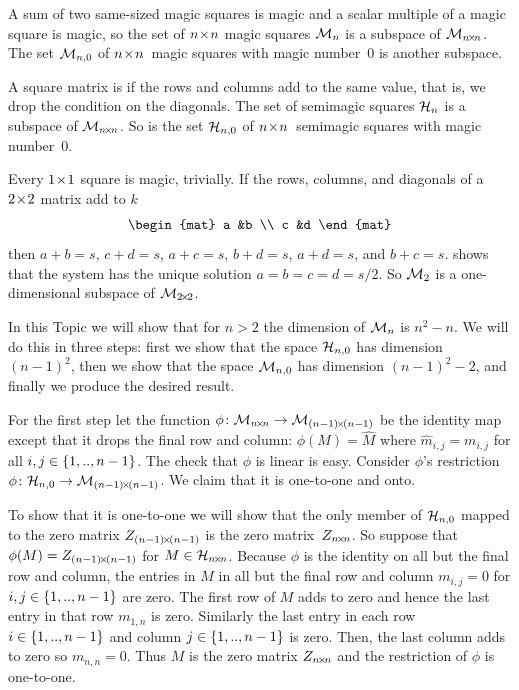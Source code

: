 A sum of two same-sized magic squares is magic and a 
scalar multiple of a magic square is magic, so the set of 
$n \! \times \! n$ magic squares
$\mathcal{M}_n$ is a subspace of $\mathcal{M}_{n \! \times \! n}$.
The set $\mathcal{M}_{n,0}$ of $n \! \times \! n$~magic squares with magic number~$0$ 
is another subspace.

A square matrix is  if 
the rows and columns add to the same value, that is, we drop the
condition on the diagonals.
The set of semimagic squares $\mathcal{H}_n$ 
is a subspace of $\mathcal{M}_{n \! \times \! n}$.
So is the set $\mathcal{H}_{n,0}$  
of $n \! \times \! n$~semimagic squares with magic number~$0$. 

Every $1 \! \times \! 1$ square is magic, trivially.
If the rows, columns, and diagonals of a $2 \! \times \! 2$ matrix add to $k$
\begin{equation*}
  \begin{mat}
    a  &b  \\
    c  &d
  \end{mat}
\end{equation*}
then $a+b=s$, $c+d=s$, $a+c=s$, $b+d=s$, $a+d=s$, and $b+c=s$.
 shows that
the system has the unique solution $a=b=c=d=s/2$.
So $\mathcal{M}_2$ is a one-dimensional subspace of $\mathcal{M}_{2 \! \times \! 2}$.

In this Topic we will show that for $n>2$ the 
dimension of
$\mathcal{M}_n$ is $n^2-n$.
We will do this in three steps: first we show that the space 
$\mathcal{H}_{n,0}$ has dimension~$(n-1)^2$,
then we show that the space $\mathcal{M}_{n,0}$ has dimension
$(n-1)^2-2$, and finally we produce the desired result.

For the first step
let the function $\mbox{$\phi\colon \mathcal{M}_{n \! \times \! n}\to \mathcal{M}_{(n-1) \! \times \! (n-1)}$}$
be the identity map except that it 
drops the final row and column: $\phi(M)=\hat{M}$ where 
$\hat{m}_{i,j}=m_{i,j}$ for all $i,j\in\mbox{$\{1,..,n-1\}$}$.
The check that $\phi$ is linear is easy.
Consider $\phi$'s restriction
$\mbox{$\phi\colon \mathcal{H}_{n,0}\to \mathcal{M}_{(n-1) \! \times \! (n-1)}$}$.
We claim that it is one-to-one and onto.

To show that it is one-to-one we will show that the only member of 
$\mathcal{H}_{n,0}$ mapped to the zero matrix $Z_{(n-1) \! \times \! (n-1)}$
is the zero matrix~$Z_{n \! \times \! n}$.
So suppose that $\phi(M)=Z_{(n-1) \! \times \! (n-1)}$ for $M\in\mathcal{H}_{n \! \times \! n}$.
Because $\phi$ is the identity on all but the final row and column,
the entries in $M$ in all but the final row and column
$m_{i,j}=0$ for $i,j\in\mbox{$\{1,..,n-1\}$}$ are zero.
The first row of $M$ adds to zero and hence
the last entry in that row $m_{1,n}$ is zero.
Similarly the last entry in each row $i\in\mbox{$\{1,..,n-1\}$}$
and column $j\in\mbox{$\{1,..,n-1\}$}$ is zero.
Then, the last column adds to zero so $m_{n,n}=0$.
Thus $M$ is the zero matrix $Z_{n \! \times \! n}$ and the restriction of $\phi$ 
is one-to-one. 

